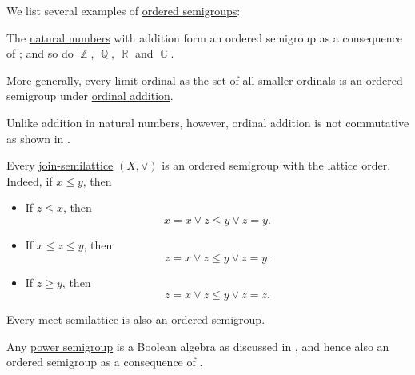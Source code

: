 \begin{example}\label{ex:def:ordered_semigroup}
  We list several examples of \hyperref[def:ordered_semigroup]{ordered semigroups}:

  \begin{thmenum}
     The \hyperref[def:natural_numbers]{natural numbers} with addition form an ordered semigroup as a consequence of ; and so do \( \BbbZ \), \( \BbbQ \), \( \BbbR \) and \( \BbbC \).

     More generally, every \hyperref[def:successor_and_limit_ordinal]{limit ordinal} as the set of all smaller ordinals is an ordered semigroup under \hyperref[def:ordinal_arithmetic/addition]{ordinal addition}.

    Unlike addition in natural numbers, however, ordinal addition is not commutative as shown in .

     Every \hyperref[def:semilattice/join]{join-semilattice} \( (X, \vee) \) is an ordered semigroup with the lattice order. Indeed, if \( x \leq y \), then
    \begin{itemize}
      \item If \( z \leq x \), then
      \begin{equation*}
        x = x \vee z \leq y \vee z = y.
      \end{equation*}

      \item If \( x \leq z \leq y \), then
      \begin{equation*}
        z = x \vee z \leq y \vee z = y.
      \end{equation*}

      \item If \( z \geq y \), then
      \begin{equation*}
        z = x \vee z \leq y \vee z = z.
      \end{equation*}
    \end{itemize}

    Every \hyperref[def:semilattice/meet]{meet-semilattice} is also an ordered semigroup.

     Any \hyperref[def:power_semigroup]{power semigroup} is a Boolean algebra as discussed in , and hence also an ordered semigroup as a consequence of .
  \end{thmenum}
\end{example}


